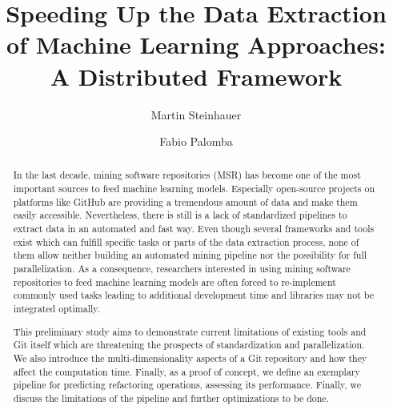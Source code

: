 \documentclass[sigconf,table,screen,xcdraw,review]{acmart}
\newcommand\iris{\textsc{DisDrillery}\xspace}
\begin{document}
\title[Speeding Up the Data Extraction of Machine Learning Approaches]{Speeding Up the Data Extraction of Machine Learning Approaches: A Distributed Framework}

	\author{Martin Steinhauer}

	\author{Fabio Palomba}

\begin{abstract}
In the last decade, mining software repositories (MSR) has become one of the most important sources to feed machine learning models. Especially open-source projects on platforms like GitHub are providing a tremendous amount of data and make them easily accessible. Nevertheless, there is still is a lack of standardized pipelines to extract data in an automated and fast way. Even though several frameworks and tools exist which can fulfill specific tasks or parts of the data extraction process, none of them allow neither building an automated mining pipeline nor the possibility for full parallelization. As a consequence, researchers interested in using mining software repositories to feed machine learning models are often forced to re-implement commonly used tasks leading to additional development time and libraries may not be integrated optimally. 

This preliminary study aims to demonstrate current limitations of existing tools and Git itself which are threatening the prospects of standardization and parallelization. We also introduce the multi-dimensionality aspects of a Git repository and how they affect the computation time. Finally, as a proof of concept, we define an exemplary pipeline for predicting refactoring operations, assessing its performance. Finally, we discuss the limitations of the pipeline and further optimizations to be done.\end{abstract}

\maketitle








\balance


\end{document}
